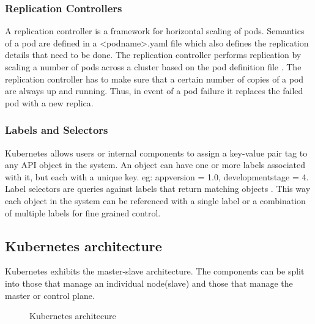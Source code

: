\documentclass[9pt,twocolumn,twoside]{../../styles/osajnl}
\begin{document}
\subsubsection{Replication Controllers}
A replication controller is a framework for horizontal scaling of
pods. Semantics of a pod are defined in a <pod\textunderscore name>.yaml file which
also defines the replication details that need to be done. The
replication controller performs replication by scaling a number of
pods across a cluster based on the pod definition file \cite{www-wiki-kubernetes}. The
replication controller has to make sure that a certain number of
copies of a pod are always up and running. Thus, in event of a pod
failure it replaces the failed pod with a new replica.

\subsubsection{Labels and Selectors}
Kubernetes allows users or internal components to assign a key-value
pair tag to any API object in the system. An object can have one or
more labels associated with it, but each with a unique key. eg:
appversion = 1.0, development\textunderscore stage = 4.  Label selectors are queries
against labels that return matching objects \cite{www-kubernetes-digitalocean}. This way each
object in the system can be referenced with a single label or a
combination of multiple labels for fine grained control.

\subsection{Kubernetes architecture}
Kubernetes exhibits the master-slave architecture. The components can
be split into those that manage an individual node(slave) and those
that manage the master or control plane.

\begin{figure}[htbp]
\centering
{}
\caption{Kubernetes architecure \cite{www-kubernetes-architecture}}
\label{fig:Kubernetes Minimum Architecture}
\end{figure}
\end{document}
